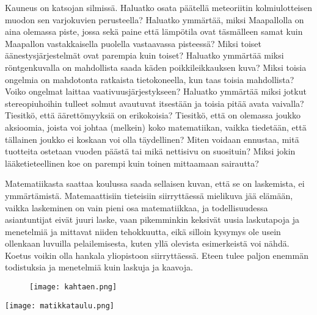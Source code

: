 \documentclass[../ala_hataile.tex]{subfiles}
\begin{document}
\clearpage


	Kauneus on katsojan silmissä. Haluatko
	osata päätellä meteoriitin kolmi\-ulotteisen
	muodon sen varjo\-kuvien perusteella? Haluatko
	ymmärtää, miksi Maa\-pallolla on aina
	olemassa piste, jossa sekä paine että lämpö\-tila
	ovat täsmälleen samat kuin Maa\-pallon
	vastakkaisella puolella vastaavassa pisteessä?
	Miksi toiset äänestys\-järjestelmät ovat
	parempia kuin toiset? Haluatko ymmärtää
	miksi röntgenkuvalla on mahdollista saada
	käden poikkileikkauksen kuva? Miksi
	toisia ongelmia on mahdotonta ratkaista
	tietokoneella, kun taas toisia mahdollista?
	Voiko ongelmat laittaa vaativuusjärjestykseen?
	Haluatko ymmärtää miksi jotkut stereopiuhoihin
	tulleet solmut avautuvat itsestään
	ja toisia pitää avata vaivalla? Tiesitkö,
	että äärettömyyksiä on erikokoisia? Tiesitkö,
	että on olemassa joukko aksioomia,
	joista voi johtaa (melkein) koko matematiikan,
	vaikka tiedetään, että tällainen joukko
	ei koskaan voi olla täydellinen? Miten voidaan ennustaa,
	mitä tuotteita ostetaan vuoden päästä tai mikä nettisivu
	on suosituin? Miksi jokin lääketieteellinen koe 
	on parempi kuin toinen mittaamaan sairautta?
	
	Matematiikasta saattaa koulussa saada
	sellaisen kuvan, että se on laskemista, ei
	ymmärtämistä. Matemaattisiin tieteisiin siirryttäessä
	mielikuva jää elämään, vaikka laskeminen on vain pieni osa
	matematiikkaa, ja todellisuudessa asiantuntijat
	eivät juuri laske, vaan pikemminkin keksivät uusia
	laskutapoja ja menetelmiä ja mittavat niiden
	tehokkuutta, eikä silloin kysymys ole usein ollenkaan
	luvuilla pelailemisesta, kuten
	yllä olevista esimerkeistä voi nähdä. Koetus
	voikin olla hankala yliopistoon
	siirryttäessä. Eteen tulee paljon
	enemmän todistuksia ja menetelmiä kuin
	laskuja ja kaavoja.
	\begin{figure}[!b]
		\centering
		\texttt{[image: kahtaen.png]}
	\end{figure}
	\begin{figure*}[!b]
		\centering
		\texttt{[image: matikkataulu.png]}
	\end{figure*}
	
\end{document}
